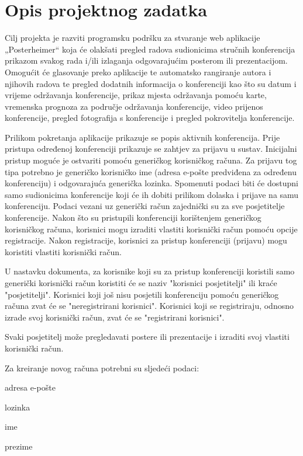 \chapter{Opis projektnog zadatka}
		
		Cilj projekta je razviti programsku podršku za stvaranje web aplikacije „Posterheimer“ koja će olakšati pregled radova sudionicima stručnih konferencija prikazom svakog rada i/ili izlaganja odgovarajućim posterom ili prezentacijom. Omogućit će glasovanje preko aplikacije te automatsko rangiranje autora i njihovih radova te pregled dodatnih informacija o konferenciji kao što su datum i vrijeme održavanja konferencije, prikaz mjesta održavanja pomoću karte, vremenska prognoza za područje održavanja konferencije, video prijenos konferencije, pregled fotografija s konferencije i pregled pokrovitelja konferencije.
		
		Prilikom pokretanja aplikacije prikazuje se popis aktivnih konferencija. Prije pristupa određenoj konferenciji prikazuje se zahtjev za prijavu u sustav. Inicijalni pristup moguće je ostvariti pomoću generičkog korisničkog računa. Za prijavu tog tipa potrebno je generičko korisničko ime (adresa e-pošte predviđena za određenu konferenciju) i odgovarajuća generička lozinka. Spomenuti podaci biti će dostupni samo sudionicima konferencije koji će ih dobiti prilikom dolaska i prijave na samu konferenciju. Podaci vezani uz generički račun zajednički su za sve posjetitelje konferencije. Nakon što su pristupili konferenciji korištenjem generičkog korisničkog računa, korisnici mogu izraditi vlastiti korisnički račun pomoću opcije registracije. Nakon registracije, korisnici za pristup konferenciji (prijavu) mogu koristiti vlastiti korisnički račun. 

		U nastavku dokumenta, za korisnike koji su za pristup konferenciji koristili samo generički korisnički račun koristiti će se naziv "korisnici posjetitelji" ili kraće "posjetitelji". Korisnici koji još nisu posjetili konferenciju pomoću generičkog računa zvat će se "neregistrirani korisnici". Korisnici koji se registriraju, odnosno izrade svoj korisnički račun, zvat će se "registrirani korisnici". 
		
		Svaki posjetitelj može pregledavati postere ili prezentacije i izraditi svoj vlastiti korisnički račun.
		
		Za kreiranje novog računa potrebni su sljedeći podaci:
		\begin{packed_item}
			\item adresa e-pošte
			\item lozinka
			\item ime
			\item prezime
		\end{packed_item}
		
